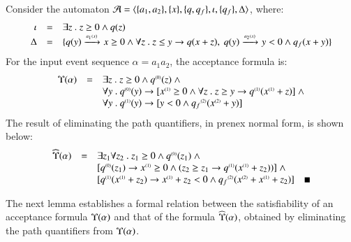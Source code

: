 \documentclass{llncs}
\begin{document}
\begin{example}\label{ex:quant-elim}
  Consider the automaton $\mathcal{A} = \langle \{ a_1,a_2 \}, \{ x \},
    \{ q,q_f \}, \iota, \{ q_f \}, \Delta \rangle$, where:
  \[\begin{array}{rcl}
  \iota & = & \exists z ~.~ z \geq 0 \wedge q(z) \\
  \Delta & = & \{ 
    q(y) \xrightarrow{{\scriptscriptstyle a_1(x)}}_{{\scriptstyle }} x\geq 0 \wedge \forall z ~.~ z \leq y \rightarrow q(x+z),~
    q(y) \xrightarrow{{\scriptscriptstyle a_2(x)}}_{{\scriptstyle }} y<0 \wedge q_f(x+y)
   \}
  \end{array}\]
  For the input event sequence $\alpha = a_1a_2$, the acceptance
  formula is:
  \[\begin{array}{rcl}
  \Upsilon({\alpha}) & = & \exists z ~.~ z \geq 0 \wedge {q}^{\scriptscriptstyle{({0})}}(z) ~\wedge \\
  && \forall y ~.~ {q}^{\scriptscriptstyle{({0})}}(y) \rightarrow [{x}^{\scriptscriptstyle{({1})}}\geq0 \wedge \forall z ~.~ z\geq y 
    \rightarrow {q}^{\scriptscriptstyle{({1})}}({x}^{\scriptscriptstyle{({1})}}+z)] ~\wedge \\
  && \forall y ~.~ {q}^{\scriptscriptstyle{({1})}}(y) \rightarrow [y<0 \wedge {q_f}^{\scriptscriptstyle{({2})}}({x}^{\scriptscriptstyle{({2})}}+y)]
  \end{array}\]
  The result of eliminating the path quantifiers, in prenex normal form, is shown below:
  \[\begin{array}{rcl}
  \quantform{\alpha} & = & \exists z_1\forall z_2 ~.~ z_1 \geq 0 \wedge \stamp{q}{0}(z_1) ~\wedge \\
  && [\stamp{q}{0}(z_1) \rightarrow \stamp{x}{1} \geq 0 \wedge (z_2 \geq z_1 \rightarrow \stamp{q}{1}(\stamp{x}{1}+z_2))] ~\wedge \\
  && [\stamp{q}{1}(\stamp{x}{1}+z_2) \rightarrow \stamp{x}{1}+z_2 < 0 \wedge \stamp{q_f}{2}(\stamp{x}{2}+\stamp{x}{1}+z_2)] 
  \enspace\enspace\hfill\blacksquare
  \end{array}\]
\end{example}

The next lemma establishes a formal relation between the
satisfiability of an acceptance formula $\Upsilon({\alpha})$ and that of
the formula $\widehat{\Upsilon}({\alpha})$, obtained by eliminating the path
quantifiers from $\Upsilon({\alpha})$.
\end{document}
